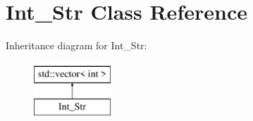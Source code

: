 \hypertarget{classInt__Str}{}\section{Int\+\_\+\+Str Class Reference}
\label{classInt__Str}
Inheritance diagram for Int\+\_\+\+Str\+:\begin{figure}[H]
\begin{center}
\leavevmode
\includegraphics[height=2.000000cm]{df/d59/classInt__Str}
\end{center}
\end{figure}
